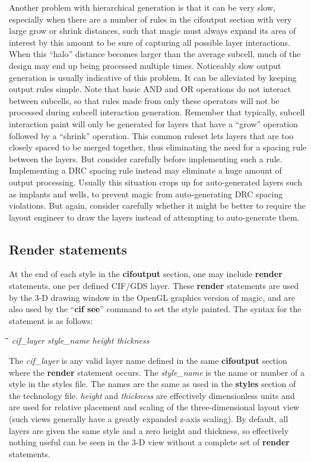 \documentclass[letterpaper,twoside,12pt]{article}
\def\hinch{\hspace*{0.5in}}
\def\starti{\begin{center}\begin{tabbing}\hinch\=\hinch\=\hinch\=\hinch\=\kill}
\def\endi{\end{tabbing}\end{center}}
\def\ii{\>\>\>}
\begin{document}
Another problem with hierarchical generation is that it can be very
slow, especially when there are a number of rules in the cifoutput
section with very large grow or shrink distances, such that magic
must always expand its area of interest by this amount to be sure
of capturing all possible layer interactions.  When this ``halo''
distance becomes larger than the average subcell, much of the
design may end up being processed multiple times.  Noticeably slow
output generation is usually indicative of this problem.  It can
be alleviated by keeping output rules simple.  Note that basic AND
and OR operations do not interact between subcells, so that rules
made from only these operators will not be processed during subcell
interaction generation.  Remember that typically, subcell interaction
paint will only be generated for layers that have a ``grow'' operation
followed by a ``shrink'' operation.  This common ruleset lets layers
that are too closely spaced to be merged together, thus eliminating
the need for a spacing rule between the layers.  But consider carefully
before implementing such a rule.  Implementing a DRC spacing rule
instead may eliminate a huge amount of output processing.  Usually
this situation crops up for auto-generated layers such as implants and
wells, to prevent magic from auto-generating DRC spacing violations.
But again, consider carefully whether it might be better to require
the layout engineer to draw the layers instead of attempting to
auto-generate them.

\subsection{Render statements}

At the end of each style in the {\bfseries cifoutput} section, one may
include {\bfseries render} statements, one per defined CIF/GDS layer.
These {\bfseries render} statements are used by the 3-D drawing window
in the OpenGL graphics version of magic, and are also used by the
``{\bfseries cif see}'' command to set the style painted.  The syntax
for the statement is as follows:

\starti
   \ii {\bfseries render} {\itshape cif\_layer style\_name height thickness}
\endi

The {\itshape cif\_layer} is any valid layer name defined in the same
{\bfseries cifoutput} section where the {\bfseries render} statement occurs.
The {\itshape style\_name} is the name or number of a style in the styles
file.  The names are the same as used in the {\bfseries styles} section of
the technology file.  {\itshape height} and {\itshape thickness} are
effectively dimensionless units and are used for relative placement and
scaling of the three-dimensional layout view (such views generally have
a greatly expanded z-axis scaling).  By default, all layers are given the
same style and a zero height and thickness, so effectively nothing useful
can be seen in the 3-D view without a complete set of {\bfseries render}
statements.
\end{document}
